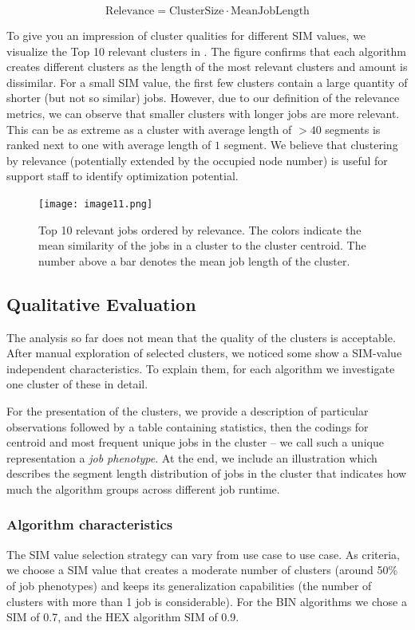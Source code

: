 \documentclass{jhps}
\begin{document}
\begin{equation}
\text{Relevance} = \text{ClusterSize} \cdot \text{MeanJobLength}
\label{eq:rel}
\end{equation}

To give you an impression of cluster qualities for different SIM values, we visualize the Top 10 relevant clusters in .
The figure confirms that each algorithm creates different clusters as the length of the most relevant clusters and amount is dissimilar.
For a small SIM value, the first few clusters contain a large quantity of shorter (but not so similar) jobs.
However, due to our definition of the relevance metrics, we can observe that smaller clusters with longer jobs are more relevant.
This can be as extreme as a cluster with average length of $>40$ segments is ranked next to one with average length of $1$ segment.
We believe that clustering by relevance (potentially extended by the occupied node number) is useful for support staff to identify optimization potential.

\begin{figure}
  \centering
   \texttt{[image: image11.png]}
   \caption{Top 10 relevant jobs ordered by relevance.
   The colors indicate the mean similarity of the jobs in a cluster to the cluster centroid.
   The number above a bar denotes the mean job length of the cluster.}
   \label{fig:top10_relevant_jobs}
\end{figure}

\subsection{Qualitative Evaluation}
The analysis so far does not mean that the quality of the clusters is acceptable.
After manual exploration of selected clusters, we noticed some show a SIM-value independent characteristics.
To explain them, for each algorithm we investigate one cluster of these in detail.

For the presentation of the clusters, we provide a description of particular observations followed by a table containing statistics, then the codings for centroid and most frequent unique jobs in the cluster -- we call such a unique representation a \textit{job phenotype}.
At the end, we include an illustration which describes the segment length distribution of jobs in the cluster that indicates how much the algorithm groups across different job runtime.

\subsubsection{Algorithm characteristics}
The SIM value selection strategy can vary from use case to use case.
As criteria, we choose a SIM value that creates a moderate number of clusters (around 50\% of job phenotypes) and keeps its generalization capabilities (the number of clusters with more than 1 job is considerable).
For the BIN algorithms we chose a SIM of 0.7, and the HEX algorithm SIM of 0.9.
\end{document}
